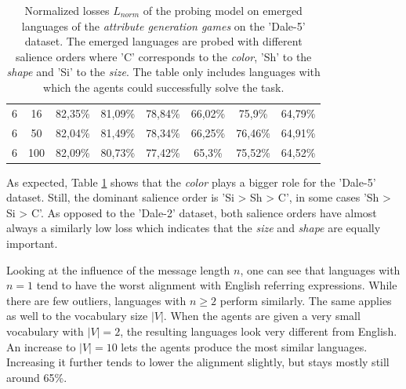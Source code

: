 \begin{table}[ht]
\begin{tabular}{cc|c|c|c|c|c|c}
        {6} & {16}  & {82,35\%}                & {81,09\%}                & {78,84\%}                & {66,02\%}                & {75,9\%}                 & {64,79\%}                \\
        {6} & {50}  & {82,04\%}                & {81,49\%}                & {78,34\%}                & {66,25\%}                & {76,46\%}                & {64,91\%}                \\
        {6} & {100} & {82,09\%}                & {80,73\%}                & {77,42\%}                & {65,3\%}                 & {75,52\%}                & {64,52\%}                \\
        \bottomrule
    \end{tabular}
    \caption{Normalized losses $L_{norm}$ of the probing model on emerged languages of the \emph{attribute generation games} on the 'Dale-5' dataset. The emerged languages are probed with different salience orders where 'C' corresponds to the \emph{color}, 'Sh' to the \emph{shape} and 'Si' to the \emph{size}. The table only includes languages with which the agents could successfully solve the task.}
    \label{tab:probing:attribute-generator:dale-5}
\end{table}

As expected, Table \ref{tab:probing:attribute-generator:dale-5} shows that the \emph{color} plays a bigger role for the 'Dale-5' dataset.
Still, the dominant salience order is 'Si > Sh > C', in some cases 'Sh > Si > C'.
As opposed to the 'Dale-2' dataset, both salience orders have almost always a similarly low loss which indicates that the \emph{size} and \emph{shape} are equally important.

Looking at the influence of the message length $n$, one can see that languages with $n=1$ tend to have the worst alignment with English referring expressions.
While there are few outliers, languages with $n \geq 2$ perform similarly.
The same applies as well to the vocabulary size $|V|$.
When the agents are given a very small vocabulary with $|V|=2$, the resulting languages look very different from English.
An increase to $|V|=10$ lets the agents produce the most similar languages.
Increasing it further tends to lower the alignment slightly, but stays mostly still around 65\%.

